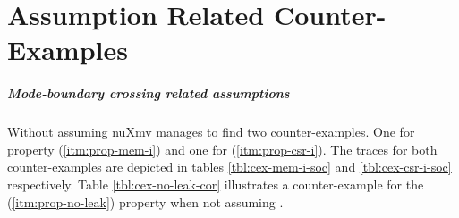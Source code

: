 \chapter{Assumption Related Counter-Examples}
\label{app:cexs}


\paragraph{Mode-boundary crossing related assumptions}
Without assuming  nuXmv manages to find two counter-examples.
One for property  (\ref{itm:prop-mem-i}) and one for  (\ref{itm:prop-csr-i}).
The traces for both counter-examples are depicted in tables \ref{tbl:cex-mem-i-soc} and \ref{tbl:cex-csr-i-soc} respectively.
Table \ref{tbl:cex-no-leak-cor} illustrates a counter-example for the  (\ref{itm:prop-no-leak}) property when not assuming .

